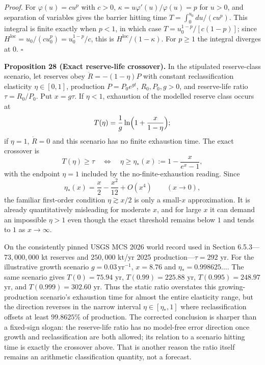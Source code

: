 \documentclass[11pt]{article}
\begin{document}
\emph{Proof.} For \(\varphi(u)=cu^p\) with \(c>0\), \(\kappa=u\varphi'(u)/\varphi(u)=p\) for \(u>0\), and separation of variables gives the barrier hitting time \(T=\int_0^{u_0}du/(cu^p)\). This integral is finite exactly when \(p<1\), in which case \(T=u_0^{1-p}/[c(1-p)]\); since \(H^{\mathrm{loc}}=u_0/(cu_0^p)=u_0^{1-p}/c\), this is \(H^{\mathrm{loc}}/(1-\kappa)\). For \(p\ge1\) the integral diverges at \(0\). \(\square\)

\textbf{Proposition 28 (Exact reserve-life crossover).} In the stipulated reserve-class scenario, let reserves obey \(\dot R=-(1-\eta)P\) with constant reclassification elasticity \(\eta\in[0,1]\), production \(P=P_0e^{gt}\), \(R_0,P_0,g>0\), and reserve-life ratio \(\tau=R_0/P_0\). Put \(x=g\tau\). If \(\eta<1\), exhaustion of the modelled reserve class occurs at
$$T(\eta)=\frac1g\ln\Bigl(1+\frac{x}{1-\eta}\Bigr);$$
if \(\eta=1\), \(\dot R=0\) and this scenario has no finite exhaustion time. The exact crossover is
$$T(\eta)\ge\tau\quad\Longleftrightarrow\quad \eta\ge\eta_*(x):=1-\frac{x}{e^x-1},$$
with the endpoint \(\eta=1\) included by the no-finite-exhaustion reading. Since
$$\eta_*(x)=\frac{x}{2}-\frac{x^2}{12}+O(x^4)\qquad(x\to0),$$
the familiar first-order condition \(\eta\gtrsim x/2\) is only a small-\(x\) approximation. It is already quantitatively misleading for moderate \(x\), and for large \(x\) it can demand an impossible \(\eta>1\) even though the exact threshold remains below \(1\) and tends to \(1\) as \(x\to\infty\).

On the consistently pinned USGS MCS 2026 world record used in Section 6.5.3---\(73{,}000{,}000\) kt reserves and \(250{,}000\) kt/yr 2025 production---\(\tau=292\) yr. For the illustrative growth scenario \(g=0.03\,\mathrm{yr}^{-1}\), \(x=8.76\) and \(\eta_*=0.998625\ldots\). The same scenario gives \(T(0)=75.94\) yr, \(T(0.99)=225.88\) yr, \(T(0.995)=248.97\) yr, and \(T(0.999)=302.60\) yr. Thus the static ratio overstates this growing-production scenario's exhaustion time for almost the entire elasticity range, but the direction reverses in the narrow interval \(\eta\in[\eta_*,1]\) where reclassification offsets at least \(99.8625\%\) of production. The corrected conclusion is sharper than a fixed-sign slogan: the reserve-life ratio has no model-free error direction once growth and reclassification are both allowed; its relation to a scenario hitting time is exactly the crossover above. That is another reason the ratio itself remains an arithmetic classification quantity, not a forecast.
\end{document}
